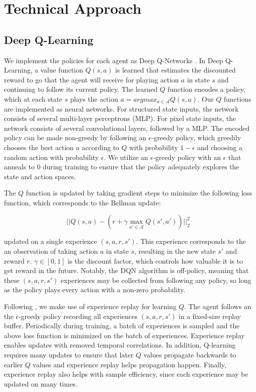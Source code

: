 \documentclass[10pt,twocolumn,letterpaper]{article}
\begin{document}
\section{Technical Approach}
\label{technical}
\subsection{Deep Q-Learning}

We implement the policies for each agent as Deep Q-Networks \citep{nature2013}.
In Deep Q-Learning, a value function $Q(s, a)$ is learned that estimates the
discounted reward to go that the agent will receive for playing action $a$ in
state $s$ and continuing to follow its current policy. The learned $Q$ function
encodes a policy, which at each state $s$ plays the action $a = argmax_{a \in
\mathcal{A}}Q(s, a)$. Our $Q$ functions are implemented as neural networks. For
structured state inputs, the network consists of several multi-layer perceptrons
(MLP). For pixel state inputs, the network consists of several convolutional
layers, followed by a MLP. The encoded policy can be made non-greedy by
following an $\epsilon$-greedy policy, which greedily chooses the best action
$a$ according to $Q$ with probability $1 - \epsilon$ and choosing a random
action with probability $\epsilon$. We utilize an $\epsilon$-greedy policy with
an $\epsilon$ that anneals to $0$ during training to ensure that the policy
adequately explores the state and action spaces.

The $Q$ function is updated by taking gradient steps to minimize the
following loss function, which corresponds to the Bellman update:

\begin{equation}
  ||Q(s, a) - (r + \gamma \max_{a' \in \mathcal{A}}Q(s', a'))||^2_2
\end{equation}

\noindent updated on a single experience $(s, a, r, s')$. This experience
corresponds to the an observation of taking action $a$ in state $s$, resulting
in the new state $s'$ and reward $r$. $\gamma \in [0, 1]$ is the discount
factor, which controls how valuable it is to get reward in the future.
Notably, the DQN algorithm is off-policy, meaning that these $(s, a, r, s')$
experiences may be collected from following any policy, so long as the policy
plays every action with a non-zero probability.

Following \citep{nature2013}, we make use of experience replay for learning $Q$. The
agent follows an the $\epsilon$-greedy policy recording all experiences $(s, a,
r, s')$ in a fixed-size replay buffer. Periodically during training, a batch
of experiences is sampled and the above loss function is minimized on the
batch of experiences. Experience replay enables updates with
removed temporal correlations. In addition, Q-learning requires many updates
to ensure that later $Q$ values propagate backwards to earlier $Q$ values and
experience replay helps propagation happen. Finally, experience replay also
helps with sample efficiency, since each experience may be updated on many
times.
\end{document}
